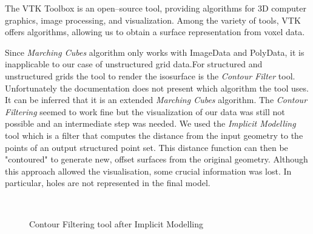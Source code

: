 The VTK Toolbox is an open--source tool, providing algorithms for 3D computer graphics, image processing, and visualization. Among the variety of tools, VTK offers algorithms, allowing us to obtain a surface representation from voxel data. 

Since \textit{Marching Cubes} algorithm only works with ImageData and PolyData, it is inapplicable to our case of unstructured grid data.For structured and unstructured grids the tool to render the isosurface is the \textit{Contour Filter} tool. Unfortunately the documentation does not present which algorithm the tool uses. It
can be inferred that it is an extended \textit{Marching Cubes} algorithm.
The \textit{Contour Filtering} seemed to work fine but the visualization of our data was still not possible
and an intermediate step was needed. We used the \textit{Implicit Modelling} tool which is a filter that
computes the distance from the input geometry to the points of an output structured point set.
This distance function can then be "contoured" to generate new, offset surfaces from the original
geometry. Although this approach allowed the visualisation, some crucial information was lost. In particular, holes are not represented in the final model.  

\begin{figure}
\centering
   \\
   \caption{Contour Filtering tool after Implicit Modelling}
\end{figure}


